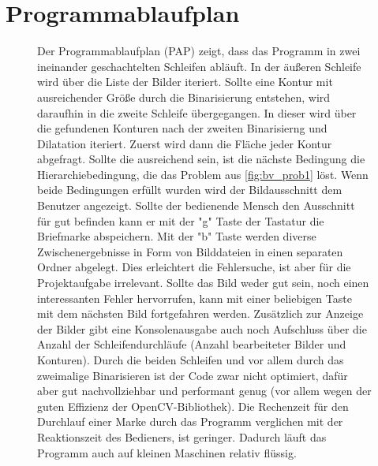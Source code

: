 \documentclass[12pt,toc=bib,toc=listof]{scrreprt}
\begin{document}
\section{Programmablaufplan}
\label{sec_bv:pap}
\begin{figure}[h]
\begin{minipage}[t]{.62\linewidth}
Der Programmablaufplan (PAP) zeigt, dass das Programm in zwei ineinander geschachtelten Schleifen abläuft. In der äußeren Schleife wird über die Liste der Bilder iteriert. Sollte eine Kontur mit ausreichender Größe durch die Binarisierung entstehen, wird daraufhin in die zweite Schleife übergegangen. In dieser wird über die gefundenen Konturen nach der zweiten Binarisierng und Dilatation iteriert. Zuerst wird dann die Fläche jeder Kontur abgefragt. Sollte die ausreichend sein, ist die nächste Bedingung die Hierarchiebedingung, die das Problem aus \ref{fig:bv_prob1} löst. Wenn beide Bedingungen erfüllt wurden wird der Bildausschnitt dem Benutzer angezeigt. Sollte der bedienende Mensch den Ausschnitt für gut befinden kann er mit der "g" Taste der Tastatur die Briefmarke abspeichern. Mit der "b" Taste werden diverse Zwischenergebnisse in Form von Bilddateien in einen separaten Ordner abgelegt. Dies erleichtert die Fehlersuche, ist aber für die Projektaufgabe irrelevant. Sollte das Bild weder gut sein,  noch einen interessanten Fehler hervorrufen, kann mit einer beliebigen Taste mit dem nächsten Bild fortgefahren werden. Zusätzlich zur Anzeige der Bilder gibt eine Konsolenausgabe auch noch Aufschluss über die Anzahl der Schleifendurchläufe (Anzahl bearbeiteter Bilder und Konturen). Durch die beiden Schleifen und vor allem durch das zweimalige Binarisieren ist der Code zwar nicht optimiert, dafür aber gut nachvollziehbar und performant genug (vor allem wegen der guten Effizienz der OpenCV-Bibliothek). Die Rechenzeit für den Durchlauf einer Marke durch das Programm verglichen mit der Reaktionszeit des Bedieners, ist geringer. Dadurch läuft das Programm auch auf kleinen Maschinen relativ flüssig.
\end{minipage}
\hfill
\begin{minipage}[t]{.33\linewidth}
\strut\vspace*{-\baselineskip}
\newline

\end{minipage}
\end{figure}
\end{document}
